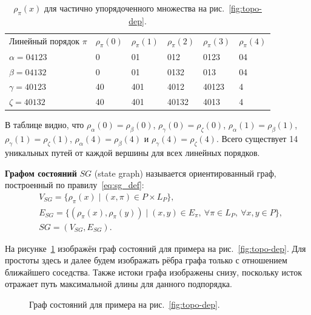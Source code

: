 \begin{table}[ht]
  \caption{$\rho_{\pi}(x)$ для частично упорядоченного
  множества на рис.~\ref{fig:topo-dep}.}
  \centering
  \begin{tabular}{llllll}
    Линейный порядок $\pi$ & $\rho_{\pi}(0)$ & $\rho_{\pi}(1)$ &
    $\rho_{\pi}(2)$ & $\rho_{\pi}(3)$ & $\rho_{\pi}(4)$ \\
    $\alpha = 04123$ & 0 & 01 & 012 & 0123 & 04 \\
    $\beta = 04132$ & 0 & 01 & 0132 & 013 & 04 \\
    $\gamma = 40123$ & 40 & 401 & 4012 & 40123 & 4 \\
    $\zeta = 40132$ & 40 & 401 & 40132 & 4013 & 4
  \end{tabular}
  \label{tab:rho_exam}
\end{table}

В таблице видно, что $\rho_{\alpha}(0) = \rho_{\beta}(0)$,
$\rho_{\gamma}(0) = \rho_{\zeta}(0)$, $\rho_{\alpha}(1) =
\rho_{\beta}(1)$, $\rho_{\gamma}(1) = \rho_{\zeta}(1)$,
$\rho_{\alpha}(4) = \rho_{\beta}(4)$ и $\rho_{\gamma}(4) =
\rho_{\zeta}(4)$. Всего существует 14 уникальных путей от каждой
вершины для всех линейных порядков.

\begin{definition}
  \textbf{Графом состояний} $SG$ (state graph) называется
  ориентированный граф, построенный по правилу~\ref{eq:sg_def}:
  \begin{equation}
    \begin{aligned}
      &V_{SG} = \{ \rho_{\pi}(x) \mid (x, \pi) \in P \times L_P \}, \\
      &E_{SG} = \{ (\rho_{\pi}(x), \rho_{\pi}(y)) \mid (x, y) \in
      E_\pi,\ \forall \pi \in L_P,\ \forall x, y \in P \}, \\
      &SG = (V_{SG}, E_{SG}).
    \end{aligned}
    \label{eq:sg_def}
  \end{equation}
\end{definition}

На рисунке~\ref{fig:sg-topo-dep} изображён граф состояний для
примера на рис.~\ref{fig:topo-dep}. Для простоты здесь и далее будем
изображать рёбра графа только с отношением ближайшего соседства.
Также истоки графа изображены снизу, поскольку исток отражает путь
максимальной длины для данного подпорядка.

\begin{figure}[htbp]
  \centerfloat{
    
  }
  \caption{Граф состояний для примера на рис.~\ref{fig:topo-dep}.}
  \label{fig:sg-topo-dep}
\end{figure}

